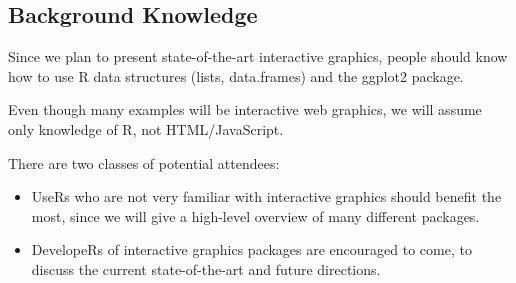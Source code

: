 \documentclass[11pt]{article}
\begin{document}
\subsection*{Background Knowledge}
\label{sec:orgheadline12}

Since we plan to present state-of-the-art interactive graphics, people
should know how to use R data structures (lists, data.frames) and the
ggplot2 package. 

Even though many examples will be interactive web graphics, we will
assume only knowledge of R, not HTML/JavaScript.

There are two classes of potential attendees:
\begin{itemize}
\item UseRs who are not very familiar with interactive graphics should
benefit the most, since we will give a high-level overview of many
different packages.
\item DevelopeRs of interactive graphics packages are encouraged to
  come, to discuss the current state-of-the-art and future directions.
\end{itemize}
\end{document}
